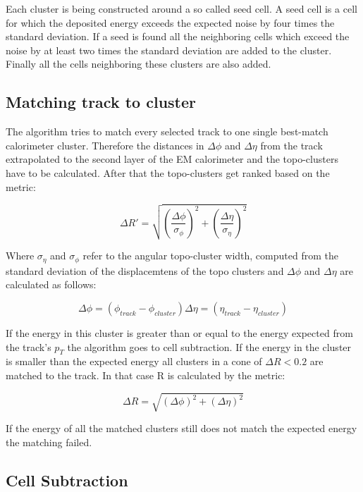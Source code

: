 Each cluster is being constructed around a so called seed cell. A seed cell is a cell for which the deposited energy exceeds the expected noise by four times the standard deviation. If a seed is found all the neighboring cells which exceed the noise by at least two times the standard deviation are added to the cluster. Finally all the cells neighboring these clusters are also added.


\subsection{Matching track to cluster}

The algorithm tries to match every selected track to one single best-match calorimeter cluster. 
Therefore the distances in $\Delta \phi$ and $\Delta \eta$ from the track extrapolated to the second layer of the EM calorimeter and the topo-clusters have to be calculated. After that the topo-clusters get ranked based on the metric:

\begin{equation}
\Delta R' = \sqrt{\left(\frac{\Delta \phi}{\sigma_{\phi}}\right)^2+\left(\frac{\Delta \eta}{\sigma_{\eta}}\right)^2}
\end{equation}

Where $\sigma_{\eta}$ and $\sigma_{\phi}$ refer to the angular topo-cluster width, computed from the standard deviation of the displacemtens of the topo clusters and $\Delta \phi$ and $\Delta \eta$ are calculated as follows:

\begin{equation}
\Delta \phi = (\phi_{track} - \phi_{cluster})
\Delta \eta = (\eta_{track} - \eta_{cluster})
\end{equation}

If the energy in this cluster is greater than or equal to the energy expected from the track's $p_T$ the algorithm goes to cell subtraction. If the energy in the cluster is smaller than the expected energy all clusters in a cone of $\Delta R < 0.2$ are matched to the track. In that case R is calculated by the metric:

\begin{equation}
\Delta R = \sqrt{(\Delta \phi)^2 + (\Delta \eta)^2}
\end{equation}

If the energy of all the matched clusters still does not match the expected energy the matching failed.

\subsection{Cell Subtraction}

